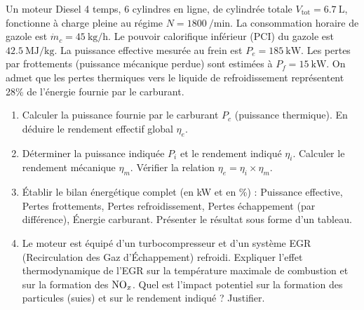 \documentclass[11pt]{article}
\begin{document}
\begin{exercice}
Un moteur Diesel 4 temps, 6 cylindres en ligne, de cylindrée totale $V_{\text{tot}} = \SI{6.7}{\liter}$, fonctionne à charge pleine au régime $N = \SI{1800}{\per\minute}$. La consommation horaire de gazole est $\dot{m}_c = \SI{45}{\kilo\gram\per\hour}$. Le pouvoir calorifique inférieur (PCI) du gazole est $\SI{42.5}{\mega\joule\per\kilo\gram}$. La puissance effective mesurée au frein est $P_e = \SI{185}{\kilo\watt}$. Les pertes par frottements (puissance mécanique perdue) sont estimées à $P_f = \SI{15}{\kilo\watt}$. On admet que les pertes thermiques vers le liquide de refroidissement représentent 28\% de l'énergie fournie par le carburant.
\begin{enumerate}
    \item Calculer la puissance fournie par le carburant $P_c$ (puissance thermique). En déduire le rendement effectif global $\eta_e$.
    \item Déterminer la puissance indiquée $P_i$ et le rendement indiqué $\eta_i$. Calculer le rendement mécanique $\eta_m$. Vérifier la relation $\eta_e = \eta_i \times \eta_m$.
    \item Établir le bilan énergétique complet (en kW et en \%) : Puissance effective, Pertes frottements, Pertes refroidissement, Pertes échappement (par différence), Énergie carburant. Présenter le résultat sous forme d'un tableau.
    \item Le moteur est équipé d'un turbocompresseur et d'un système EGR (Recirculation des Gaz d'Échappement) refroidi. Expliquer l'effet thermodynamique de l'EGR sur la température maximale de combustion et sur la formation des $\ce{NO_x}$. Quel est l'impact potentiel sur la formation des particules (suies) et sur le rendement indiqué ? Justifier.
\end{enumerate}
\end{exercice}
\end{document}
